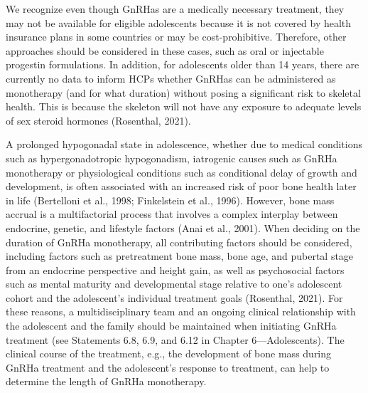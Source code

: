 \documentclass[
]{book}
\begin{document}
We recognize even though GnRHas are a medically necessary treatment, they may not be available for eligible adolescents because it is not
covered by health insurance plans in some countries or may be cost-prohibitive. Therefore, other
approaches should be considered in these cases,
such as oral or injectable progestin formulations.
In addition, for adolescents older than 14 years,
there are currently no data to inform HCPs
whether GnRHas can be administered as monotherapy (and for what duration) without posing
a significant risk to skeletal health. This is because
the skeleton will not have any exposure to adequate levels of sex steroid hormones
(Rosenthal, 2021).

A prolonged hypogonadal state in adolescence,
whether due to medical conditions such as hypergonadotropic hypogonadism, iatrogenic causes
such as GnRHa monotherapy or physiological
conditions such as conditional delay of growth
and development, is often associated with an
increased risk of poor bone health later in life
(Bertelloni et al., 1998; Finkelstein et al., 1996).
However, bone mass accrual is a multifactorial
process that involves a complex interplay between
endocrine, genetic, and lifestyle factors (Anai
et al., 2001). When deciding on the duration of
GnRHa monotherapy, all contributing factors
should be considered, including factors such as
pretreatment bone mass, bone age, and pubertal
stage from an endocrine perspective and height
gain, as well as psychosocial factors such as mental maturity and developmental stage relative to
one's adolescent cohort and the adolescent's individual treatment goals (Rosenthal, 2021). For
these reasons, a multidisciplinary team and an
ongoing clinical relationship with the adolescent
and the family should be maintained when initiating GnRHa treatment (see Statements 6.8, 6.9,
and 6.12 in Chapter 6---Adolescents). The clinical
course of the treatment, e.g., the development of
bone mass during GnRHa treatment and the adolescent's response to treatment, can help to determine the length of GnRHa monotherapy.
\end{document}
